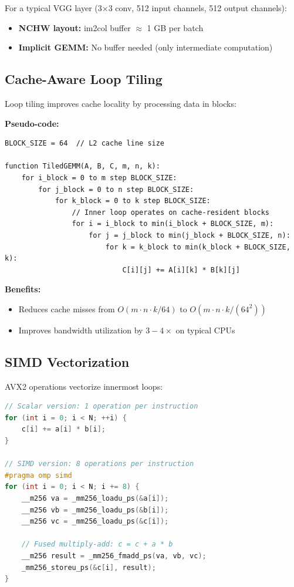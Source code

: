 \documentclass[12pt,oneside,a4paper]{report}
\begin{document}
For a typical VGG layer (3×3 conv, 512 input channels, 512 output channels):
\begin{itemize}
    \item \textbf{NCHW layout:} im2col buffer $\approx$ 1 GB per batch
    \item \textbf{Implicit GEMM:} No buffer needed (only intermediate computation)
\end{itemize}

\subsection{Cache-Aware Loop Tiling}

Loop tiling improves cache locality by processing data in blocks:

\textbf{Pseudo-code:}

\begin{lstlisting}
BLOCK_SIZE = 64  // L2 cache line size

function TiledGEMM(A, B, C, m, n, k):
    for i_block = 0 to m step BLOCK_SIZE:
        for j_block = 0 to n step BLOCK_SIZE:
            for k_block = 0 to k step BLOCK_SIZE:
                // Inner loop operates on cache-resident blocks
                for i = i_block to min(i_block + BLOCK_SIZE, m):
                    for j = j_block to min(j_block + BLOCK_SIZE, n):
                        for k = k_block to min(k_block + BLOCK_SIZE, k):
                            C[i][j] += A[i][k] * B[k][j]
\end{lstlisting}

\textbf{Benefits:}
\begin{itemize}
    \item Reduces cache misses from $O(m \cdot n \cdot k / 64)$ to $O(m \cdot n \cdot k / (64^2))$
    \item Improves bandwidth utilization by $3-4\times$ on typical CPUs
\end{itemize}

\subsection{SIMD Vectorization}

AVX2 operations vectorize innermost loops:

\begin{lstlisting}[language=C++]
// Scalar version: 1 operation per instruction
for (int i = 0; i < N; ++i) {
    c[i] += a[i] * b[i];
}

// SIMD version: 8 operations per instruction
#pragma omp simd
for (int i = 0; i < N; i += 8) {
    __m256 va = _mm256_loadu_ps(&a[i]);
    __m256 vb = _mm256_loadu_ps(&b[i]);
    __m256 vc = _mm256_loadu_ps(&c[i]);

    // Fused multiply-add: c = c + a * b
    __m256 result = _mm256_fmadd_ps(va, vb, vc);
    _mm256_storeu_ps(&c[i], result);
}
\end{lstlisting}
\end{document}

